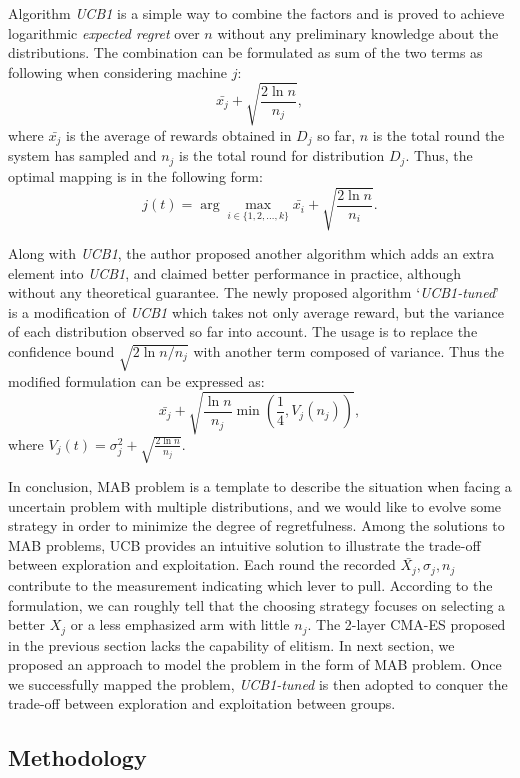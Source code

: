 Algorithm \emph{UCB1} is a simple way to combine the factors and is
proved to achieve logarithmic \emph{expected regret} over $n$ without
any preliminary knowledge about the distributions.
The combination can be formulated as sum of the two terms as following
when considering machine $j$: \[\bar{x_j} +
\sqrt{\frac{2\ln{n}}{n_j}},\] where $\bar{x_j}$ is the average of
rewards obtained in $D_j$ so far, $n$ is the total round the system has
sampled and $n_j$ is the total round for distribution $D_j$.
Thus, the optimal mapping is in the following form: \[j(t) = \arg\max_{i
\in \{1,2,\ldots,k\}}\bar{x_i} + \sqrt{\frac{2\ln{n}}{n_i}}.\]

Along with \emph{UCB1}, the author proposed another algorithm which adds
an extra element into \emph{UCB1}, and claimed better performance in
practice, although without any theoretical guarantee.
The newly proposed algorithm `\emph{UCB1-tuned}' is a modification of
\emph{UCB1} which takes not only average reward, but the variance of
each distribution observed so far into account.
The usage is to replace the confidence bound
\emph{$\sqrt{2\ln{n}/{n_j}}$} with another term composed of variance.
Thus the modified formulation can be expressed as:
\[\bar{x_j} + \sqrt{\frac{\ln{n}}{n_j} \min(\frac{1}{4},V_j(n_j))},\]
where $V_j(t) =\sigma_j^2 + \sqrt{\frac{2\ln n}{n_j}}$.

In conclusion, MAB problem is a template to describe the situation when
facing a uncertain problem with multiple distributions, and we would
like to evolve some strategy in order to minimize the degree of
regretfulness.
Among the solutions to MAB problems, UCB provides an intuitive solution
to illustrate the trade-off between exploration and exploitation.
Each round the recorded $\bar{X_j},\sigma_j,n_j$ contribute to the
measurement indicating which lever to pull.
According to the formulation, we can roughly tell that the choosing
strategy focuses on selecting a better $X_j$ or a less emphasized arm
with little $n_j$.
The 2-layer CMA-ES proposed in the previous section lacks the capability
of elitism.
In next section, we proposed an approach to model the problem in the
form of MAB problem.
Once we successfully mapped the problem, \emph{UCB1-tuned} is then
adopted to conquer the trade-off between exploration and exploitation
between groups.

\subsection{Methodology}


